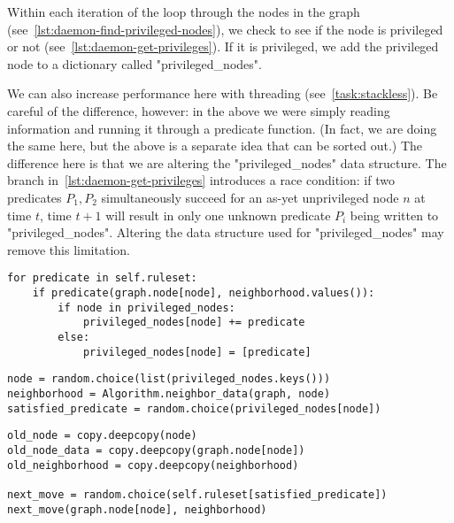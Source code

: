 Within each iteration of the loop through the nodes in the graph
  (see~\autoref{lst:daemon-find-privileged-nodes}),
  we check to see if the node is privileged or not
  (see~\autoref{lst:daemon-get-privileges}).
If it is privileged, we add the privileged node to a dictionary called "privileged_nodes".
\begin{warning}
  We can also increase performance here with threading (see~\autoref{task:stackless}).
  Be careful of the difference, however:
    in the above we were simply reading information and
    running it through a predicate function.
  (In fact, we are doing the same here,
    but the above is a separate idea that can be sorted out.)
  The difference here is that we are altering the "privileged_nodes" data structure.
  The branch in~\autoref{lst:daemon-get-privileges} introduces a race condition:
    if two predicates $P_1, P_2$ simultaneously succeed for
    an as-yet unprivileged node $n$ at time $t$,
    time $t+1$ will result in only one unknown predicate
    $P_i$ being written to "privileged_nodes".
  Altering the data structure used for "privileged_nodes" may remove this limitation.
\end{warning}

\begin{lstlisting}[float=p, caption={Getting the privileges of a single node.}, label={lst:daemon-get-privileges}]
for predicate in self.ruleset:
    if predicate(graph.node[node], neighborhood.values()):
        if node in privileged_nodes:
            privileged_nodes[node] += predicate
        else:
            privileged_nodes[node] = [predicate]
\end{lstlisting}

\begin{lstlisting}[float=p, caption={Picking a random, satisfied predicate.}, label={lst:daemon-pick-predicate}]
node = random.choice(list(privileged_nodes.keys()))
neighborhood = Algorithm.neighbor_data(graph, node)
satisfied_predicate = random.choice(privileged_nodes[node])
\end{lstlisting}

\begin{lstlisting}[float=p, caption={Applying a random move enabled by the satisfied predicate.}, label={lst:daemon-apply-move}]
old_node = copy.deepcopy(node)
old_node_data = copy.deepcopy(graph.node[node])
old_neighborhood = copy.deepcopy(neighborhood)

next_move = random.choice(self.ruleset[satisfied_predicate])
next_move(graph.node[node], neighborhood)
\end{lstlisting}


